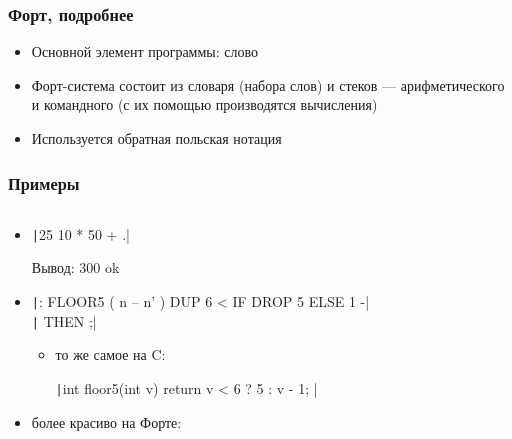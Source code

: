 \documentclass{../../slides-style}
\begin{document}
    \begin{frame}
        \frametitle{Форт, подробнее}
        \begin{itemize}
            \item Основной элемент программы: слово
            \item Форт-система состоит из словаря (набора слов) и стеков --- арифметического и командного (с их помощью производятся вычисления)
            \item Используется обратная польская нотация
        \end{itemize}
    \end{frame}

    \begin{frame}
        \frametitle{Примеры}
        \begin{columns}
            \begin{column}{0.82\textwidth}
                \begin{itemize}
                    \item \texttt|25 10 * 50 + .|

                        Вывод: 300 ok
                    \item \texttt|: FLOOR5 ( n -- n' )   DUP 6 < IF DROP 5 ELSE 1 -| \\
                        \texttt|  THEN ;|
                    \begin{itemize}
                        \item то же самое на C:

                        \texttt|int floor5(int v) { return v < 6 ? 5 : v - 1; }|
                    \end{itemize}
                    \item более красиво на Форте:


\end{itemize}
\end{column}
\end{columns}
\end{frame}
\end{document}
